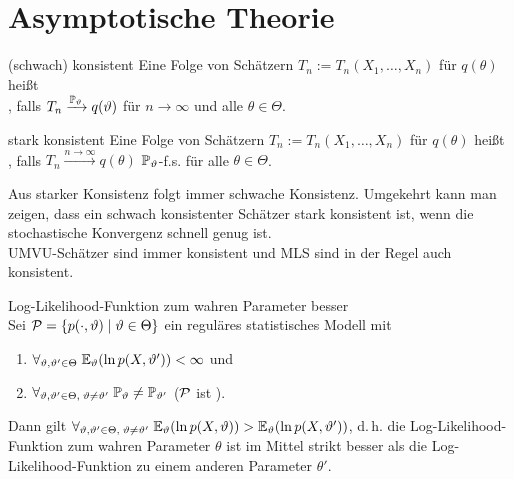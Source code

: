 \pagebreak

\section{%
    Asymptotische Theorie%
}

\begin{Def}{(schwach) konsistent}
    Eine Folge von Schätzern $T_n := T_n(X_1, \dotsc, X_n)$ für $q(\theta)$ heißt\\
    , falls
    $T_n \xrightarrow{\PP_\theta} q(\theta)$ für $n \to \infty$ und alle $\theta \in \Theta$.
\end{Def}

\begin{Def}{stark konsistent}
    Eine Folge von Schätzern $T_n := T_n(X_1, \dotsc, X_n)$ für $q(\theta)$ heißt\\
    , falls
    $T_n \xrightarrow{n \to \infty} q(\theta)$ $\PP_\theta$-f.s. für alle $\theta \in \Theta$.
\end{Def}

\begin{Bem}
    Aus starker Konsistenz folgt immer schwache Konsistenz.
    Umgekehrt kann man zeigen, dass ein schwach konsistenter Schätzer stark konsistent ist,
    wenn die stochastische Konvergenz schnell genug ist.\\
    UMVU-Schätzer sind immer konsistent und MLS sind in der Regel auch konsistent.
\end{Bem}

\linie

\begin{Satz}{Log-Likelihood-Funktion zum wahren Parameter besser}\\
    Sei $\P = \{p(\cdot, \theta) \;|\; \theta \in \Theta\}$
    ein reguläres statistisches Modell mit
    \begin{enumerate}
        \item
        $\forall_{\theta, \theta' \in \Theta}\; \EE_\theta(\ln p(X, \theta')) < \infty$ und

        \item
        $\forall_{\theta, \theta' \in \Theta,\; \theta \not= \theta'}\;
        \PP_\theta \not= \PP_{\theta'}$
        ($\P$ ist ).
    \end{enumerate}
    Dann gilt $\forall_{\theta, \theta' \in \Theta,\; \theta \not= \theta'}\;
    \EE_\theta(\ln p(X, \theta)) > \EE_\theta(\ln p(X, \theta'))$,
    d.\,h. die Log-Likelihood-Funktion zum wahren Parameter $\theta$ ist im Mittel strikt besser
    als die Log-Likelihood-Funktion zu einem anderen Parameter $\theta'$.
\end{Satz}


